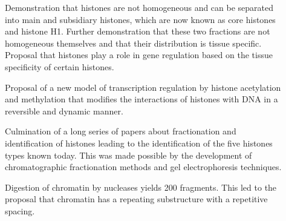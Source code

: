{\begin{shaded}
\begin{description}
          \item[\cite{stedman1951main-histones-separation}]
            Demonstration that histones are not homogeneous and can be
            separated into main and subsidiary histones,
            which are now known as core histones and histone H1.
            Further demonstration that these two fractions are not
            homogeneous themselves and that
            their distribution is tissue specific.
            Proposal that histones play a role in gene regulation based
            on the tissue specificity of certain histones.

          \item[\cite{allfrey1964acetylation}]
            Proposal of a new model of transcription regulation by
            histone acetylation and methylation that modifies the
            interactions of histones with DNA in a reversible and
            dynamic manner.

          \item[\cite{philips-and-johns1965-fractionation}]
            Culmination of a long series of papers about fractionation and
            identification of histones leading to the identification of
            the five histones types known today.
            This was made possible by the development of chromatographic
            fractionation methods and gel electrophoresis techniques.

          \item[\cite{hewish1973-200bp-pieces}]
            Digestion of chromatin by nucleases yields \SI{200}{\bp}
            fragments.  This led to the proposal that chromatin has a repeating
            substructure with a repetitive spacing.


\end{description}
\end{shaded}}
